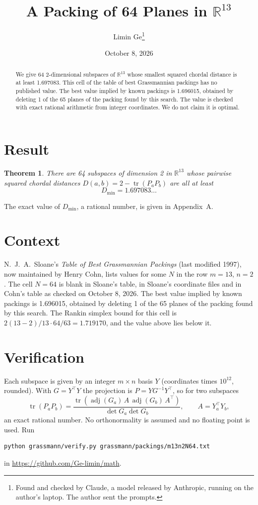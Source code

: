 \documentclass[11pt,a4paper]{article}
\title{A Packing of 64 Planes in $\mathbb{R}^{13}$}
\author{Limin Ge\thanks{Found and checked by Claude, a model released by Anthropic, running on the author's laptop. The author sent the prompts.}}
\date{October 8, 2026}
\newtheorem*{theorem}{Theorem}
\begin{document}
\maketitle
\begin{abstract}
We give 64 2-dimensional subspaces of $\mathbb{R}^{13}$ whose smallest squared chordal distance is at least 1.697083. This cell of the table of best Grassmannian packings has no published value. The best value implied by known packings is 1.696015, obtained by deleting 1 of the 65 planes of the packing found by this search. The value is checked with exact rational arithmetic from integer coordinates. We do not claim it is optimal.
\end{abstract}

\section{Result}
\begin{theorem}
There are 64 subspaces of dimension 2 in $\mathbb{R}^{13}$ whose pairwise squared chordal distances $D(a,b) = 2 - \operatorname{tr}(P_aP_b)$ are all at least
\[ D_{\min} = 1.697083\ldots \]
\end{theorem}
The exact value of $D_{\min}$, a rational number, is given in Appendix~A.


\section{Context}
N.~J.~A.~Sloane's \emph{Table of Best Grassmannian Packings} (last modified 1997), now maintained by Henry Cohn, lists values for some $N$ in the row $m=13$, $n=2$. The cell $N=64$ is blank in Sloane's table, in Sloane's coordinate files and in Cohn's table as checked on October 8, 2026. The best value implied by known packings is 1.696015, obtained by deleting 1 of the 65 planes of the packing found by this search. The Rankin simplex bound for this cell is $2(13-2)/13\cdot 64/63 = 1.719170$, and the value above lies below it.


\section{Verification}
Each subspace is given by an integer $m\times n$ basis $Y$ (coordinates times $10^{12}$, rounded). With $G=Y^\top Y$ the projection is $P=YG^{-1}Y^\top$, so for two subspaces
\[ \operatorname{tr}(P_aP_b)=\frac{\operatorname{tr}(\operatorname{adj}(G_a)\,A\,\operatorname{adj}(G_b)\,A^\top)}{\det G_a\det G_b},\qquad A=Y_a^\top Y_b, \]
an exact rational number. No orthonormality is assumed and no floating point is used. Run
\begin{verbatim}
python grassmann/verify.py grassmann/packings/m13n2N64.txt
\end{verbatim}
in \url{https://github.com/Ge-limin/math}.
\end{document}
